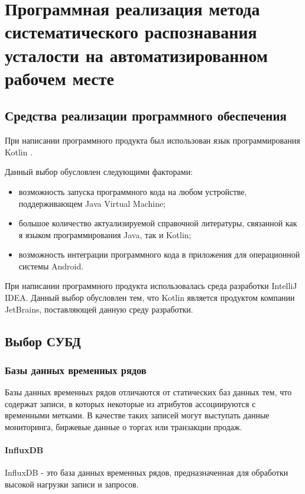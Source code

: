 \section{Программная реализация метода систематического распознавания усталости на автоматизированном рабочем месте}

\subsection{Средства реализации программного обеспечения}
При написании программного продукта был использован язык программирования Kotlin \cite{Kotlin}.

Данный выбор обусловлен следующими факторами:
\begin{itemize}[leftmargin=1.6\parindent]
	\item возможность запуска программного кода на любом устройстве, поддерживающем Java Virtual Machine;
	\item большое количество актуализируемой справочной литературы, связанной как я языком программирования Java, так и Kotlin;
	\item возможность интеграции программного кода в приложения для операционной системы Android.
\end{itemize}

При написании программного продукта использовалась среда разработки IntelliJ IDEA. Данный выбор обусловлен тем, что Kotlin является продуктом компании JetBrains, поставляющей данную среду разработки.

\subsection{Выбор СУБД}

\subsubsection{Базы данных временных рядов}
Базы данных временных рядов отличаются от статических баз данных тем, что содержат записи, в которых некоторые из атрибутов ассоциируются с временными метками. В качестве таких записей могут выступать данные мониторинга, биржевые данные о торгах или транзакции продаж. \cite{bdvrAnomalies}

\paragraph{InfluxDB}
InfluxDB - это база данных временных рядов, предназначенная для обработки высокой нагрузки записи и запросов.


